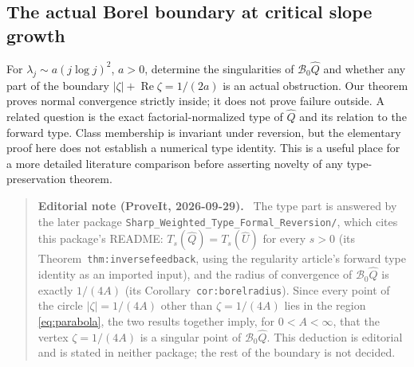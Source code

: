 \documentclass[11pt,a4paper]{article}
\numberwithin{equation}{section}
\theoremstyle{definition}
\theoremstyle{remark}
\newcommand{\U}{\widehat U}
\newcommand{\Q}{\widehat Q}
\newcommand{\B}{\mathcal B_0}
\newcommand{\Ree}{\operatorname{Re}}
\newenvironment{ednote}{\par\smallskip\begin{quote}\small\raggedright\textbf{Editorial note (ProveIt, 2026-09-29).}\ }{\end{quote}\smallskip}
\begin{document}
\subsection{The actual Borel boundary at critical slope growth}
For $\lambda_j\sim a(j\log j)^2$, $a>0$, determine the singularities of
$\B\Q$ and whether any part of the boundary
$|\zeta|+\Ree\zeta=1/(2a)$ is an actual obstruction.  Our theorem proves
normal convergence strictly inside; it does not prove failure outside.
A related question is the exact factorial-normalized type of $\Q$ and its
relation to the forward type.  Class membership is invariant under
reversion, but the elementary proof here does not establish a numerical
type identity.  This is a useful place for a more detailed literature
comparison before asserting novelty of any type-preservation theorem.
\begin{ednote}
The type part is answered by the later package
\nolinkurl{Sharp_Weighted_Type_Formal_Reversion/}, which cites this
package's README: $T_s(\Q)=T_s(\U)$ for every $s>0$ (its
Theorem~\texttt{thm:inversefeedback}, using the regularity article's forward type
identity as an imported input), and the radius of convergence of $\B\Q$
is exactly $1/(4A)$ (its Corollary~\texttt{cor:borelradius}). Since every point of
the circle $|\zeta|=1/(4A)$ other than $\zeta=1/(4A)$ lies in the region
\eqref{eq:parabola}, the two results together imply, for $0<A<\infty$,
that the vertex $\zeta=1/(4A)$ is a singular point of $\B\Q$. This
deduction is editorial and is stated in neither package; the rest of the
boundary is not decided.
\end{ednote}
\end{document}
